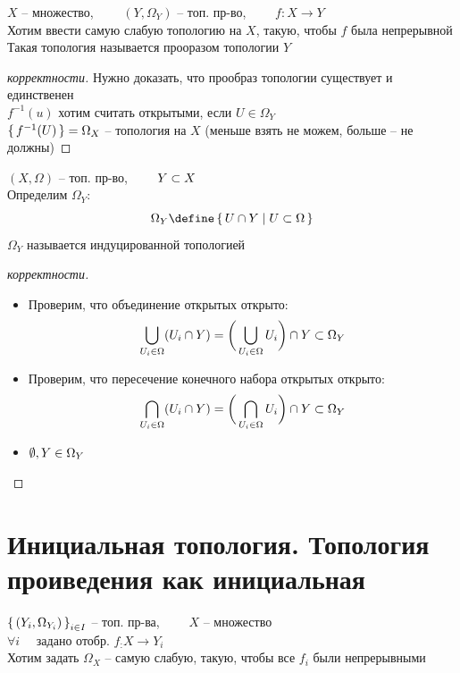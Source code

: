 \begin{definition}
	$ X $ -- множество, $ \qquad (Y, \Omega_Y) $ -- топ. пр-во, $ \qquad f : X \to Y $ \\
	Хотим ввести самую слабую топологию на $ X $, такую, чтобы $ f $ была непрерывной \\
	Такая топология называется прооразом топологии $ Y $
\end{definition}

\begin{proof}[корректности]
	Нужно доказать, что прообраз топологии существует и единственен \\
	$ f^{-1}(u) $ хотим считать открытыми, если $ U \in \Omega_Y $ \\
	$ \set{f^{-1}(U)} = \Omega_X $ -- топология на $ X $ (меньше взять не можем, больше -- не должны)
\end{proof}

\begin{definition}
	$ (X, \Omega) $ -- топ. пр-во, $ \qquad Y \subset X $ \\
	Определим $ \Omega_Y $:
	$$ \Omega_Y \define \set{U \cap Y | U \sub \Omega} $$
	$ \Omega_Y $ называется индуцированной топологией
\end{definition}

\begin{proof}[корректности]
	\hfill
	\begin{itemize}
		\item Проверим, что объединение открытых открыто:
		$$ \bigcup_{U_i \in \Omega} (U_i \cap Y) = \bigg( \bigcup_{U_i \in \Omega} U_i \bigg) \cap Y \subset \Omega_Y $$
		\item Проверим, что пересечение конечного набора открытых открыто:
		$$ \bigcap_{U_i \in \Omega} (U_i \cap Y) = \bigg( \bigcap_{U_i \in \Omega} U_i \bigg) \cap Y \subset \Omega_Y $$
		\item $ \emptyset, Y \in \Omega_Y $
	\end{itemize}

\end{proof}

\section{Инициальная топология. Топология проиведения как инициальная}

\begin{definition}
	$ \set{(Y_i, \Omega_{Y_i})}_{i \in I} $ -- топ. пр-ва, $ \qquad X $ -- множество \\
	$ \forall i \quad $ задано отобр. $ f_ : X \to Y_i $ \\
	Хотим задать $ \Omega_X $ -- самую слабую, такую, чтобы все $ f_i $ были непрерывными
\end{definition}

